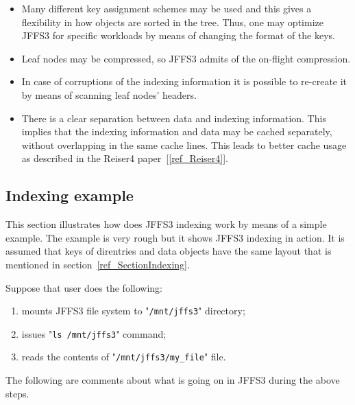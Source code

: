 \begin{itemize}

\item Many different key assignment schemes may be used and this gives a
flexibility in how objects are sorted in the tree. Thus, one may optimize JFFS3
for specific workloads by means of changing the format of the keys.

\item Leaf nodes may be compressed, so JFFS3 admits of the \mbox{on-flight}
compression.

\item In case of corruptions of the indexing information it is possible to
\mbox{re-create} it by means of scanning leaf nodes' headers.

\item There is a clear separation between data and indexing information. This
implies that the indexing information and data may be cached separately,
without overlapping in the same cache lines. This leads to better cache usage
as described in the Reiser4 paper~[\ref{ref_Reiser4}].

\end{itemize}

%
%
\subsection{Indexing example}

This section illustrates how does JFFS3 indexing work by means of a simple
example. The example is very rough but it shows JFFS3 indexing in action. It is
assumed that keys of direntries and data objects have the same layout that
is mentioned in section~\ref{ref_SectionIndexing}.

Suppose that user does the following:

\begin{enumerate}

\item mounts JFFS3 file system to "\texttt{/mnt/jffs3}" directory;

\item issues "\texttt{ls /mnt/jffs3}" command;

\item reads the contents of "\texttt{/mnt/jffs3/my\_file}" file.

\end{enumerate}

The following are comments about what is going on in JFFS3 during the above
steps.

